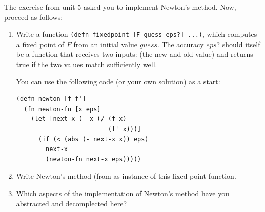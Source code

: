 \documentclass[11pt,a4paper]{article}
\begin{document}
\begin{exercise}

The exercise from unit 5 asked you to implement Newton's method.
Now, proceed as follows:
    
\begin{enumerate}[label=\alph*)]
\item Write a function \texttt{(defn fixedpoint [F guess eps?] ...)}, which computes a fixed point of $F$ from an initial value $guess$.
    The accuracy $eps?$ should itself be a function that receives two inputs: (the new and old value) and returns true if the two values match sufficiently well.

    You can use the following code (or your own solution) as a start:

\begin{verbatim}
(defn newton [f f']
  (fn newton-fn [x eps]
    (let [next-x (- x (/ (f x)
                         (f' x)))]
      (if (< (abs (- next-x x)) eps)
        next-x
        (newton-fn next-x eps)))))
\end{verbatim}

\item Write Newton's method (from as instance of this fixed point function.
\item Which aspects of the implementation of Newton's method have you abstracted and decomplected here?
\end{enumerate}
\end{exercise}
\end{document}
